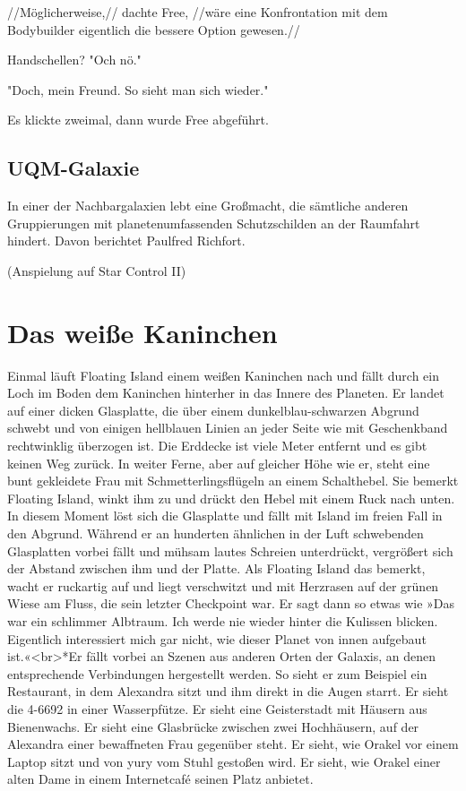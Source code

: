 //Möglicherweise,// dachte Free, //wäre eine Konfrontation mit dem Bodybuilder eigentlich die bessere Option gewesen.//

Handschellen? "Och nö."

"Doch, mein Freund. So sieht man sich wieder."

Es klickte zweimal, dann wurde Free abgeführt.


\section{UQM-Galaxie}

In einer der Nachbargalaxien lebt eine Großmacht, die sämtliche anderen Gruppierungen mit planetenumfassenden Schutzschilden an der Raumfahrt hindert. Davon berichtet Paulfred Richfort.

(Anspielung auf Star Control II)


\chapter{Das weiße Kaninchen}

Einmal läuft Floating Island einem weißen Kaninchen nach und fällt durch ein Loch im Boden dem Kaninchen hinterher in das Innere des Planeten. Er landet auf einer dicken Glasplatte, die über einem dunkelblau-schwarzen Abgrund schwebt und von einigen hellblauen Linien an jeder Seite wie mit Geschenkband rechtwinklig überzogen ist. Die Erddecke ist viele Meter entfernt und es gibt keinen Weg zurück. In weiter Ferne, aber auf gleicher Höhe wie er, steht eine bunt gekleidete Frau mit Schmetterlingsflügeln an einem Schalthebel. Sie bemerkt Floating Island, winkt ihm zu und drückt den Hebel mit einem Ruck nach unten. In diesem Moment löst sich die Glasplatte und fällt mit Island im freien Fall in den Abgrund. Während er an hunderten ähnlichen in der Luft schwebenden Glasplatten vorbei fällt und mühsam lautes Schreien unterdrückt, vergrößert sich der Abstand zwischen ihm und der Platte. Als Floating Island das bemerkt, wacht er ruckartig auf und liegt verschwitzt und mit Herzrasen auf der grünen Wiese am Fluss, die sein letzter Checkpoint war. Er sagt dann so etwas wie »Das war ein schlimmer Albtraum. Ich werde nie wieder hinter die Kulissen blicken. Eigentlich interessiert mich gar nicht, wie dieser Planet von innen aufgebaut ist.«<br>*Er fällt vorbei an Szenen aus anderen Orten der Galaxis, an denen entsprechende Verbindungen hergestellt werden. So sieht er zum Beispiel ein Restaurant, in dem Alexandra sitzt und ihm direkt in die Augen starrt. Er sieht die 4-6692 in einer Wasserpfütze. Er sieht eine Geisterstadt mit Häusern aus Bienenwachs. Er sieht eine Glasbrücke zwischen zwei Hochhäusern, auf der Alexandra einer bewaffneten Frau gegenüber steht. Er sieht, wie Orakel vor einem Laptop sitzt und von yury vom Stuhl gestoßen wird. Er sieht, wie Orakel einer alten Dame in einem Internetcafé seinen Platz anbietet.






